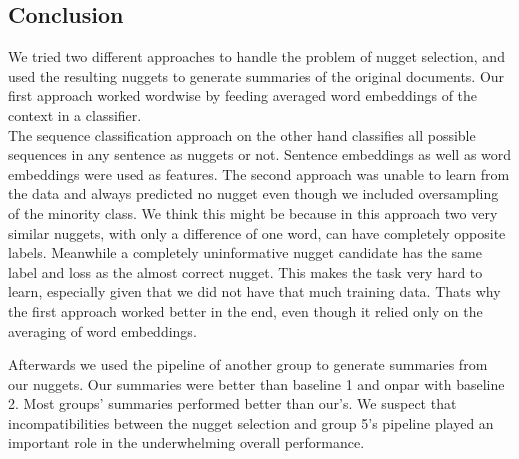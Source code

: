 \subsection{Conclusion}
We tried two different approaches to handle the problem of nugget selection, and used the resulting nuggets to generate summaries of the original documents.
Our first approach worked wordwise by feeding averaged word embeddings of the context in a classifier.\\
The sequence classification approach on the other hand classifies all possible sequences in any sentence as nuggets or not. Sentence embeddings as well as word embeddings were used as features. 
The second approach was unable to learn from the data and always predicted no nugget even though we included oversampling of the minority class. We think this might be because in this approach two very similar nuggets, with only a difference of one word, can have completely opposite labels. Meanwhile a completely uninformative nugget candidate has the same label and loss as the almost correct nugget. This makes the task very hard to learn, especially given that we did not have that much training data. Thats why the first approach worked better in the end, even though it relied only on the averaging of word embeddings.

Afterwards we used the pipeline of another group to generate summaries from our nuggets. Our summaries were better than baseline 1 and onpar with baseline 2. Most groups' summaries performed better than our's. We suspect that incompatibilities between the nugget selection and group 5's pipeline played an important role in the underwhelming overall performance.
